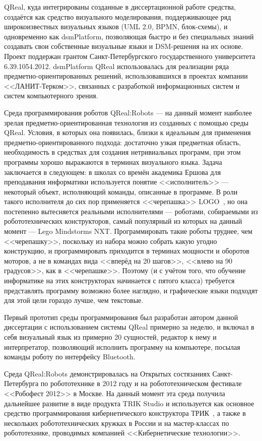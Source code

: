 QReal, куда интегрированы созданные в диссертационной работе средства, создаётся как средство визуального моделирования, поддерживающее ряд широкоизвестных 
визуальных языков (\ac{UML} 2.0, \ac{BPMN}, блок-схемы), и одновременно как \ac{dsmPlatform}, 
позволяющая быстро и без специальных знаний создавать свои собственные 
визуальные языки и \ac{DSM}-решения на их основе. Проект поддержан грантом Санкт-Петербургского 
государственного университета 6.39.1054.2012. \ac{dsmPlatform} QReal использовалась
для реализации ряда предметно-ориентированных решений, использовавшихся в 
проектах компании <<ЛАНИТ-Терком>>, связанных с разработкой информационных систем 
и систем компьютерного зрения.

Среда программирования роботов QReal:Robots --- на данный момент наиболее зрелая 
предметно-ориентированная технология из созданных с помощью среды QReal. 
Условия, в которых она появилась, близки к идеальным для применения 
предметно-ориентированного подхода: достаточно узкая предметная область, 
необходимость в средствах для создания нетривиальных программ, при этом
программы хорошо выражаются в терминах визуального языка. Задача заключается в 
следующем: в школах со времён академика Ершова для преподавания информатики 
используется понятие <<исполнитель>> --- некоторый объект, исполняющий команды, 
описанные в программе. В роли такого исполнителя до сих пор применяется 
<<черепашка>> LOGO~\cite{myrobot}, но она постепенно вытесняется реальными исполнителями --- 
роботами, собираемыми из робототехнических конструкторов, самый популярный из которых на 
данный момент --- Lego Mindstorms NXT. Программировать такие роботы труднее, чем <<черепашку>>, 
поскольку из набора можно собрать какую угодно конструкцию, и программировать приходится в терминах 
мощности и оборотов моторов, а не в командах вида <<вперёд на 20 шагов>>, 
<<влево на 90 градусов>>, как в <<черепашке>>. Поэтому (и с учётом того, что 
обучение информатике на этих конструкторах начинается с пятого класса) требуется 
представлять программу возможно более наглядно, и графические языки подходят 
для этой цели гораздо лучше, чем текстовые. 

Первый прототип среды программирования был разработан автором данной диссертации
с использованием системы QReal примерно за неделю, и включал в себя визуальный 
язык из примерно 20 сущностей, редактор к нему и интерпретатор, позволяющий 
исполнить программу на компьютере, посылая команды роботу по интерфейсу 
\ac{Bluetooth}. 

Среда QReal:Robots демонстрировалась на Открытых состязаниях Санкт-Петербурга по робототехнике 
в 2012 году и на робототехническом фестивале <<Робофест 2012>> в Москве. На данный 
момент эта среда получила дальнейшее развитие в виде продукта TRIK Studio и используется как основное средство 
программирования кибернетического конструктора ТРИК~\cite{trik}, 
а также в нескольких робототехнических кружках в России и на мастер-классах по 
робототехнике, проводимых компанией <<Кибернетические технологии>>.

